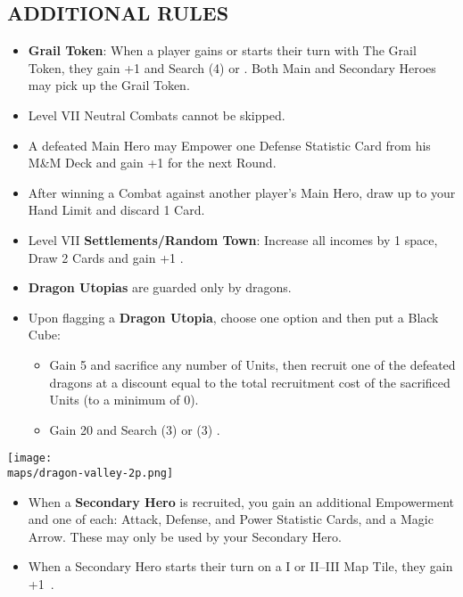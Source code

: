 \begin{multicols*}{2}
\subsection*{\MakeUppercase{Additional Rules}}
\begin{itemize}
  \item \textbf{Grail Token}: When a player gains or starts their turn with The Grail Token, they gain +1  and Search (4)  or . Both Main and Secondary Heroes may pick up the Grail Token.
  \item Level VII Neutral Combats cannot be skipped.
  \item A defeated Main Hero may Empower one Defense Statistic Card from his M\&M Deck and gain +1  for the next Round.
  \item After winning a Combat against another player's Main Hero, draw up to your Hand Limit and discard 1 Card.
  \item Level VII \textbf{Settlements/Random Town}: Increase all incomes by 1 space, Draw 2 Cards and gain +1 .
  \item \textbf{Dragon Utopias} are guarded only by dragons.
  \item Upon flagging a \textbf{Dragon Utopia}, choose one option and then put a Black Cube:
  \begin{itemize}
    \item Gain 5  and sacrifice any number of Units, then recruit one of the defeated dragons at a discount equal to the total recruitment cost of the sacrificed Units (to a minimum of 0).
    \item Gain 20  and Search (3)  or (3) .
  \end{itemize}
\end{itemize}

\begin{center}
  \vspace*{\fill}
  \texttt{[image: \\maps/dragon-valley-2p.png]}
\end{center}

\begin{itemize}
  \item When a \textbf{Secondary Hero} is recruited, you gain an additional Empowerment and one of each: Attack, Defense, and Power Statistic Cards, and a Magic Arrow. These may only be used by your Secondary Hero.
  \item When a Secondary Hero starts their turn on a I or II--III Map Tile, they gain +1~.
\end{itemize}


\end{multicols*}
